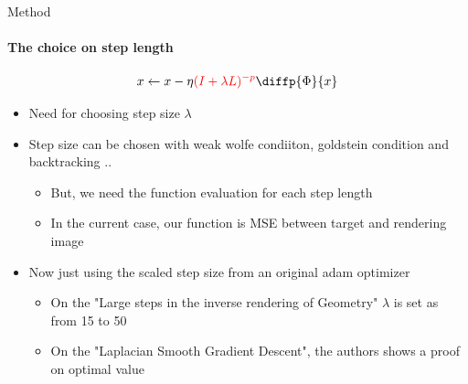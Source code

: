 \documentclass[beamer]{standalone}
\begin{document}
\begin{frame}{Method}
    \framesubtitle{The choice on step length}
        \begin{equation}
            x \leftarrow x - \eta \textcolor{red}{(I + \lambda L)^{-p}} {\diffp{\Phi}{x}}
        \end{equation}
        \begin{itemize}    
            \item Need for choosing step size $\lambda$
            \item Step size can be chosen with weak wolfe condiiton, goldstein condition and backtracking ..
            \begin{itemize}
                \item But, we need the function evaluation for each step length
                \item In the current case, our function is MSE between target and rendering image
            \end{itemize}
            \item Now just using the scaled step size from an original adam optimizer
            \begin{itemize}
                \item On the "Large steps in the inverse rendering of Geometry" $\lambda$ is set as from 15 to 50
                \item On the "Laplacian Smooth Gradient Descent", the authors shows a proof on optimal value
            \end{itemize}
        \end{itemize}
\end{frame}
\end{document}
